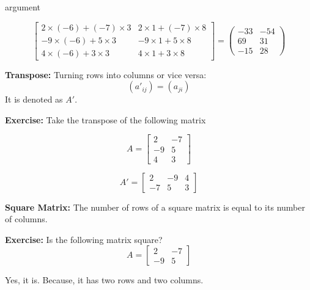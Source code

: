 \begin{labeling}{argument}
    \begin{sol}
        \[
            \begin{bmatrix}
                2 \times (-6) + (-7) \times 3
                 & 2 \times 1 + (-7) \times 8 \\
                -9 \times (-6) + 5 \times 3
                 & -9 \times 1 + 5 \times 8   \\
                4 \times (-6) + 3 \times 3
                 & 4 \times 1 + 3 \times 8
            \end{bmatrix}
            =
            \begin{pmatrix}
                -33 & -54 \\
                69  & 31  \\
                -15 & 28
            \end{pmatrix}
        \]
    \end{sol}

    \item[\textbf{Transpose:}] Turning rows into columns or vice versa:
    \[
        (a'_{ij}) = (a_{ji})
    \]
    It is denoted as $A'$.

    \textbf{Exercise:} Take the transpose of the following matrix

    \[
        A = \begin{bmatrix}
            2  & -7 \\
            -9 & 5  \\
            4  & 3
        \end{bmatrix}
    \]

    \begin{sol}
        \[
            A' = \begin{bmatrix}
                2  & -9 & 4 \\
                -7 & 5  & 3
            \end{bmatrix}
        \]
    \end{sol}

    \item[\textbf{Square Matrix:}] The number of rows of a square matrix is equal to its number of columns.

    \textbf{Exercise:} Is the following matrix square?
    \[
        A = \begin{bmatrix}
            2  & -7 \\
            -9 & 5
        \end{bmatrix}
    \]

    \begin{sol}
        Yes, it is. Because, it has two rows and two columns.
    \end{sol}


\end{labeling}
